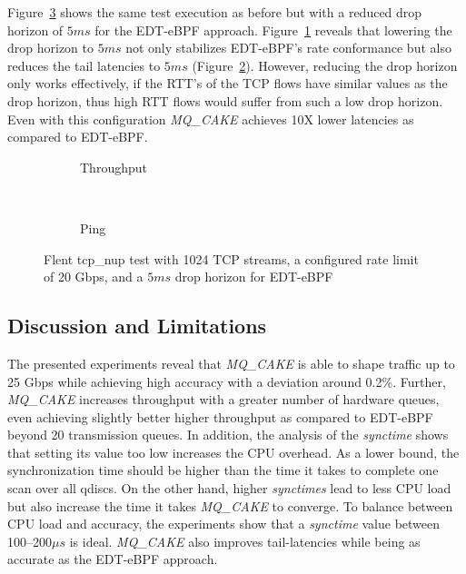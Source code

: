 Figure~\ref{fig:flent_5ms} shows the same test execution as before but with a reduced drop horizon of $5ms$ for the EDT-eBPF approach. Figure~\ref{fig:flent_tp_5ms} reveals that lowering the drop horizon to $5ms$ not only stabilizes EDT-eBPF's rate conformance but also reduces the tail latencies to $5ms$ (Figure~\ref{fig:flent_ping_5ms}).
%
However, reducing the drop horizon only works effectively, if the RTT's of the TCP flows have similar values as the drop horizon, thus high RTT flows would suffer from such a low drop horizon.
Even with this configuration \textit{MQ\_CAKE} achieves 10X lower latencies as compared to EDT-eBPF. 
\begin{figure}
    \centering
    \hspace{-0.25cm}
    \begin{subfigure}{\linewidth}
        \centering
        
        \caption{Throughput}\label{fig:flent_tp_5ms}
    \end{subfigure}
    \\
    \begin{subfigure}{\linewidth}
        \centering
        
        \caption{Ping}\label{fig:flent_ping_5ms}
    \end{subfigure}
    \caption{Flent tcp\_nup test with 1024 TCP streams, a configured rate limit of 20 Gbps, and a $5ms$ drop horizon for EDT-eBPF}\label{fig:flent_5ms}
\end{figure}

\subsection{Discussion and Limitations}
The presented experiments reveal that \textit{MQ\_CAKE} is able to shape traffic up to 25 Gbps while achieving high accuracy with a deviation around 0.2\%.
%
Further, \textit{MQ\_CAKE} increases throughput with a greater number of hardware queues, even achieving slightly better higher throughput as compared to EDT-eBPF beyond 20 transmission queues.
%
In addition, the analysis of the \textit{synctime} shows that setting its value too low increases the CPU overhead.
%
As a lower bound, the synchronization time should be higher than the time it takes to complete one scan over all qdiscs.
%
On the other hand, higher \textit{synctimes} lead to less CPU load but also increase the time it takes \textit{MQ\_CAKE} to converge.
%
To balance between CPU load and accuracy, the experiments show that a \textit{synctime} value between 100--200$\mu s$ is ideal.
\textit{MQ\_CAKE} also improves tail-latencies while being as accurate as the EDT-eBPF approach.

